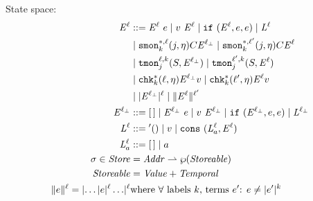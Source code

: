 \documentclass[preprint,onecolumn,9pt]{sigplanconf} %
\begin{document}
State space:
\begin{align*}
\mathit{E}^{\ell} &::=
      \mathit{E}^{\ell}\ e
 \mid v\ \mathit{E}^{\ell}
 \mid {\tt if}{\ }({\mathit{E}^{\ell},e,e})
 \mid \mathit{L}^{\ell} \\
&\mid {\tt smon}{^{*,\ell}_{k}}({j, \eta}){C}{\mathit{E}^{\ell_\bot}}
 \mid {\tt smon}{^{*,\ell^\prime}_{k}}({j, \eta}){C}{\mathit{E}^{\ell}} \\
&\mid {\tt tmon}{^{\ell,k}_{j}}({S, \mathit{E}^{\ell_\bot}})
 \mid {\tt tmon}{^{\ell^\prime,k}_{j}}({S, \mathit{E}^{\ell}}) \\
&\mid {\tt chk}{^{*}_{k}}({\ell, \eta}){\mathit{E}^{\ell_\bot}}{v}
 \mid {\tt chk}{^{*}_{k}}({\ell^\prime, \eta}){\mathit{E}^{\ell}}{v} \\
&\mid \lvert\mathit{E}^{\ell_\bot}\rvert^{\ell}
 \mid \lVert\mathit{E}^{\ell}\rVert^{\ell^\prime}
\\
\mathit{E}^{\ell_\bot} &::=
      [\,]
 \mid \mathit{E}^{\ell_\bot}\ e
 \mid v\ \mathit{E}^{\ell_\bot}
 \mid {\tt if}{\ }({\mathit{E}^{\ell_\bot},e,e})
 \mid \mathit{L}^{\ell_\bot}
\\
\mathit{L}^{\ell} &::=
      {\tt '()}
 \mid v
 \mid {\tt \tt cons}{\ }({\mathit{L}^{\ell}_a, \mathit{E}^{\ell}})
 \\
\mathit{L}^{\ell}_a &::=
 [\,] \mid a
\\
\sigma \in \mathit{Store} &= \mathit{Addr} \mathrel{\rightharpoonup} \wp(\mathit{Storeable}) \\
\mathit{Storeable} &= \mathit{Value} + \mathit{Temporal} \\
\lVert e\rVert^{\ell} = \lvert \ldots \lvert e\rvert^{\ell} \ldots \rvert^{\ell}
&\text{where $\forall$ labels $k$, terms $e^\prime$: $e \neq \lvert e^\prime\rvert^{k}$}
\end{align*}
\end{document}
